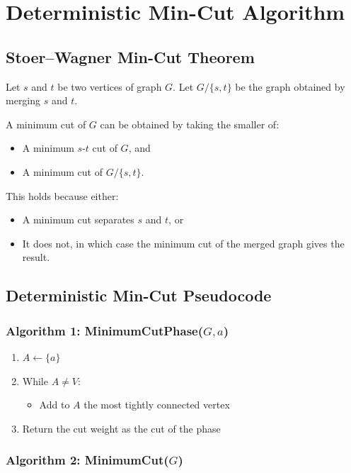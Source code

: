 \documentclass[12pt]{article}
\begin{document}
\section{Deterministic Min-Cut Algorithm}

\subsection{Stoer--Wagner Min-Cut Theorem}

Let $s$ and $t$ be two vertices of graph $G$. Let $G/\{s,t\}$ be the graph obtained by merging $s$ and $t$.

A minimum cut of $G$ can be obtained by taking the smaller of:
\begin{itemize}
    \item A minimum $s$-$t$ cut of $G$, and
    \item A minimum cut of $G/\{s,t\}$.
\end{itemize}

This holds because either:
\begin{itemize}
    \item A minimum cut separates $s$ and $t$, or
    \item It does not, in which case the minimum cut of the merged graph gives the result.
\end{itemize}

\subsection{Deterministic Min-Cut Pseudocode}

\subsubsection*{Algorithm 1: MinimumCutPhase($G,a$)}

\begin{enumerate}
    \item $A \gets \{a\}$
    \item While $A \neq V$:
    \begin{itemize}
        \item Add to $A$ the most tightly connected vertex
    \end{itemize}
    \item Return the cut weight as the cut of the phase
\end{enumerate}

\subsubsection*{Algorithm 2: MinimumCut($G$)}
\end{document}
